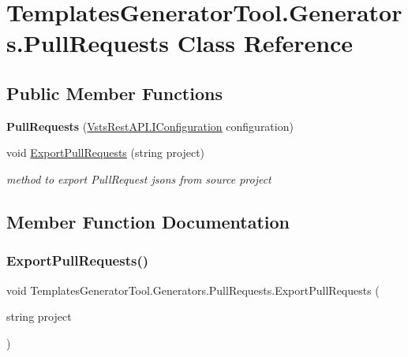 \hypertarget{class_templates_generator_tool_1_1_generators_1_1_pull_requests}{}\section{Templates\+Generator\+Tool.\+Generators.\+Pull\+Requests Class Reference}
\label{class_templates_generator_tool_1_1_generators_1_1_pull_requests}
\subsection*{Public Member Functions}
\begin{DoxyCompactItemize}
\item 
\mbox{\label{class_templates_generator_tool_1_1_generators_1_1_pull_requests_a02fb0623117f96693b9aa0a104c1bd15}} 
{\bfseries Pull\+Requests} (\mbox{\hyperlink{interface_vsts_rest_a_p_i_1_1_i_configuration}{Vsts\+Rest\+A\+P\+I.\+I\+Configuration}} configuration)
\item 
void \mbox{\hyperlink{class_templates_generator_tool_1_1_generators_1_1_pull_requests_aff016c663661c1421f673f1a707c362c}{Export\+Pull\+Requests}} (string project)
\begin{DoxyCompactList}\small\item\em method to export Pull\+Request jsons from source project \end{DoxyCompactList}\end{DoxyCompactItemize}


\subsection{Member Function Documentation}
\mbox{\label{class_templates_generator_tool_1_1_generators_1_1_pull_requests_aff016c663661c1421f673f1a707c362c}} 
\subsubsection{\texorpdfstring{Export\+Pull\+Requests()}{ExportPullRequests()}}
{\footnotesize\ttfamily void Templates\+Generator\+Tool.\+Generators.\+Pull\+Requests.\+Export\+Pull\+Requests (\begin{DoxyParamCaption}\item[{string}]{project }\end{DoxyParamCaption})}



